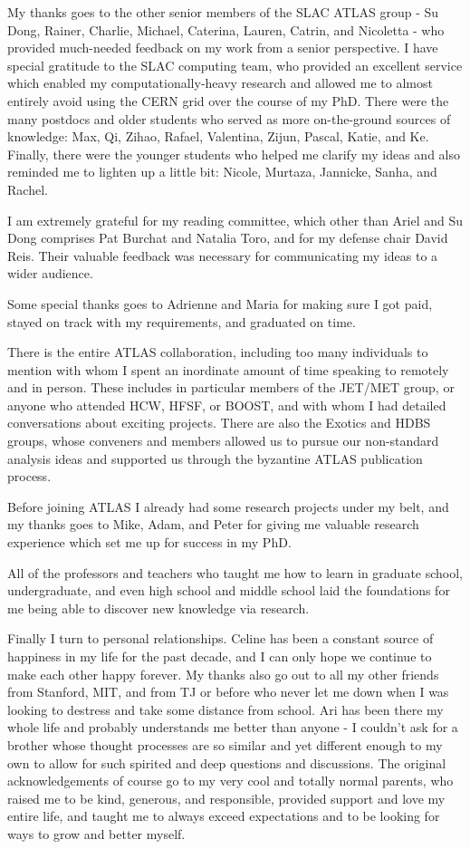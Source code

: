 My thanks goes to the other senior members of the SLAC ATLAS group - Su Dong, Rainer, Charlie, Michael, Caterina, Lauren, Catrin, and Nicoletta - who provided much-needed feedback on my work from a senior perspective.
I have special gratitude to the SLAC computing team, who provided an excellent service which enabled my computationally-heavy research and allowed me to almost entirely avoid using the CERN grid over the course of my PhD.
There were the many postdocs and older students who served as more on-the-ground sources of knowledge: Max, Qi, Zihao, Rafael, Valentina, Zijun, Pascal, Katie, and Ke.
Finally, there were the younger students who helped me clarify my ideas and also reminded me to lighten up a little bit: Nicole, Murtaza, Jannicke, Sanha, and Rachel.

I am extremely grateful for my reading committee, which other than Ariel and Su Dong comprises Pat Burchat and Natalia Toro, and for my defense chair David Reis.
Their valuable feedback was necessary for communicating my ideas to a wider audience.

Some special thanks goes to Adrienne and Maria for making sure I got paid, stayed on track with my requirements, and graduated on time.

There is the entire ATLAS collaboration, including too many individuals to mention with whom I spent an inordinate amount of time speaking to remotely and in person.
These includes in particular members of the JET/MET group, or anyone who attended HCW, HFSF, or BOOST, and with whom I had detailed conversations about exciting projects. 
There are also the Exotics and HDBS groups, whose conveners and members allowed us to pursue our non-standard analysis ideas and supported us through the byzantine ATLAS publication process.

Before joining ATLAS I already had some research projects under my belt, and my thanks goes to Mike, Adam, and Peter for giving me valuable research experience which set me up for success in my PhD.

All of the professors and teachers who taught me how to learn in graduate school, undergraduate, and even high school and middle school laid the foundations for me being able to discover new knowledge via research.

Finally I turn to personal relationships.
Celine has been a constant source of happiness in my life for the past decade, and I can only hope we continue to make each other happy forever.
My thanks also go out to all my other friends from Stanford, MIT, and from TJ or before who never let me down when I was looking to destress and take some distance from school.
Ari has been there my whole life and probably understands me better than anyone - I couldn't ask for a brother whose thought processes are so similar and yet different enough to my own to allow for such spirited and deep questions and discussions.
The original acknowledgements of course go to my very cool and totally normal parents, who raised me to be kind, generous, and responsible, provided support and love my entire life, and taught me to always exceed expectations and to be looking for ways to grow and better myself.
